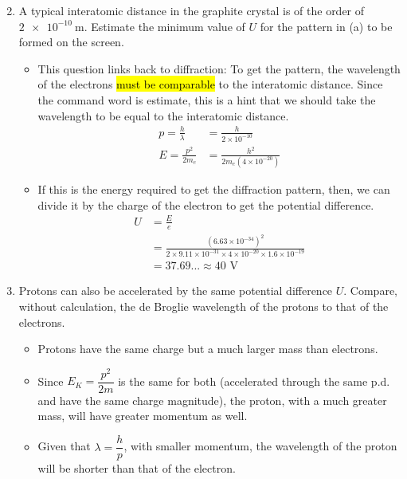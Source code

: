 \documentclass[a4paper,12pt]{article}
\begin{document}
\begin{enumerate}[label=(\alph*)]
  \setcounter{enumi}{1}
  \item A typical interatomic distance in the graphite crystal is of the order of $\SI{2e-10}{\m}$. Estimate the minimum value of $U$ for the pattern in (a) to be formed on the screen.
        \begin{itemize}
          \item This question links back to diffraction: To get the pattern, the wavelength of the electrons \hl{must be comparable} to the interatomic distance. Since the command word is estimate, this is a hint that we should take the wavelength to be equal to the interatomic distance.
                \begin{align*}
                  p = \frac{h}{\lambda} & = \frac{h}{2\times 10^{-10}}         \\
                  E = \frac{p^2}{2m_e}  & = \frac{h^2}{2m_e(4\times 10^{-20})}
                \end{align*}
          \item If this is the energy required to get the diffraction pattern, then, we can divide it by the charge of the electron to get the potential difference.
                \begin{align*}
                  U & = \frac{E}{e}                                                                                                 \\
                    & = \frac{(6.63\times 10^{-34})^2}{2\times 9.11\times 10^{-31}\times 4\times 10^{-20}\times 1.6\times 10^{-19}} \\
                    & = 37.69... \approx 40 \text{ V}
                \end{align*}
        \end{itemize}
  \item Protons can also be accelerated by the same potential difference $U$. Compare, without calculation, the de Broglie wavelength of the protons to that of the electrons.
        \begin{itemize}
          \item Protons have the same charge but a much larger mass than electrons.
          \item Since $E_K = \dfrac{p^2}{2m}$ is the same for both (accelerated through the same p.d. and have the same charge magnitude), the proton, with a much greater mass, will have greater momentum as well.
          \item Given that $\lambda = \dfrac{h}{p}$, with smaller momentum, the wavelength of the proton will be shorter than that of the electron.
        \end{itemize}
\end{enumerate}
\end{document}
